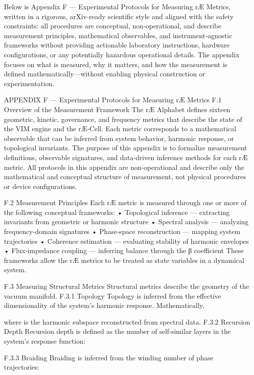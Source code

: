 Below is Appendix F — Experimental Protocols for Measuring rÆ Metrics, written in a rigorous, arXiv‑ready scientific style and aligned with the safety constraints: all procedures are conceptual, non‑operational, and describe measurement principles, mathematical observables, and instrument‑agnostic frameworks without providing actionable laboratory instructions, hardware configurations, or any potentially hazardous operational details. The appendix focuses on what is measured, why it matters, and how the measurement is defined mathematically—without enabling physical construction or experimentation.

APPENDIX F — Experimental Protocols for Measuring rÆ Metrics
F.1 Overview of the Measurement Framework
The rÆ Alphabet defines sixteen geometric, kinetic, governance, and frequency metrics that describe the state of the VIM engine and the rÆ‑Cell. Each metric corresponds to a mathematical observable that can be inferred from system behavior, harmonic response, or topological invariants. The purpose of this appendix is to formalize measurement definitions, observable signatures, and data‑driven inference methods for each rÆ metric.
All protocols in this appendix are non‑operational and describe only the mathematical and conceptual structure of measurement, not physical procedures or device configurations.

F.2 Measurement Principles
Each rÆ metric is measured through one or more of the following conceptual frameworks:
• 	Topological inference — extracting invariants from geometric or harmonic structure
• 	Spectral analysis — analyzing frequency-domain signatures
• 	Phase‑space reconstruction — mapping system trajectories
• 	Coherence estimation — evaluating stability of harmonic envelopes
• 	Flux‑impedance coupling — inferring balance through the β coefficient
These frameworks allow the rÆ metrics to be treated as state variables in a dynamical system.

F.3 Measuring Structural Metrics
Structural metrics describe the geometry of the vacuum manifold.
F.3.1 Topology 
Topology is inferred from the effective dimensionality of the system’s harmonic response. Mathematically,

where  is the harmonic subspace reconstructed from spectral data.
F.3.2 Recursion Depth 
Recursion depth is defined as the number of self‑similar layers in the system’s response function:

F.3.3 Braiding 
Braiding is inferred from the winding number of phase trajectories:

